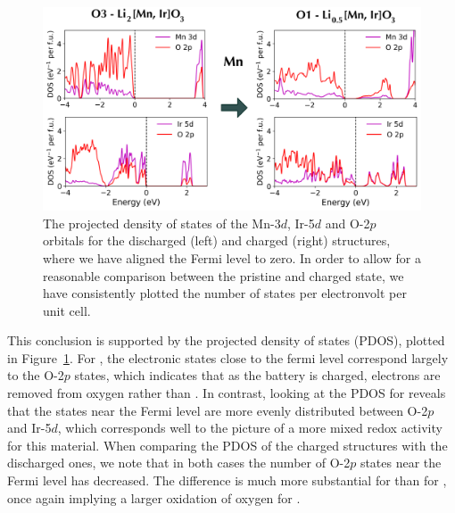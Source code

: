 \begin{refsection}
\begin{figure}[h]
\centering
\includegraphics[width=\textwidth]{Figures/batteries/charge_pdos_Mn_Ir.png}
\caption{The projected density of states of the Mn-3$d$, Ir-5$d$ and O-2$p$ orbitals for the discharged (left) and charged (right) structures, where we have aligned the Fermi level to zero. In order to allow for a reasonable comparison between the pristine and charged state, we have consistently plotted the number of states per electronvolt per unit cell.}
\label{batteries:fig-charge_pdos_Mn_Ir}
\end{figure}

This conclusion is supported by the projected density of states (PDOS), plotted in Figure~\ref{batteries:fig-charge_pdos_Mn_Ir}. For , the electronic states close to the fermi level correspond largely to the O-2$p$ states, which indicates that as the battery is charged, electrons are removed from oxygen rather than . In contrast, looking at the PDOS for  reveals that the states near the Fermi level are more evenly distributed between O-2$p$ and Ir-5$d$, which corresponds well to the picture of a more mixed redox activity for this material. When comparing the PDOS of the charged structures with the discharged ones, we note that in both cases the number of O-2$p$ states near the Fermi level has decreased. The difference is much more substantial for  than for , once again implying a larger oxidation of oxygen for .


 \label{batteries:sec-dimer}


\end{refsection}
